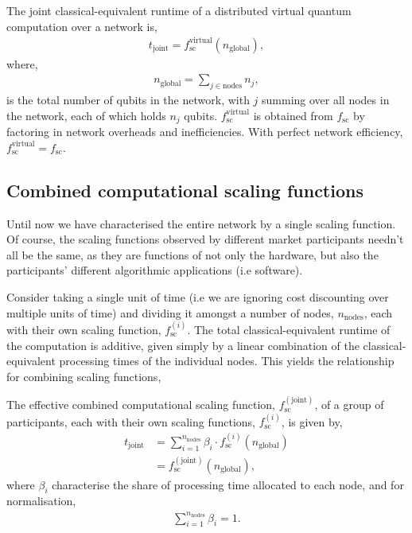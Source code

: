 \begin{definition}
The joint classical-equivalent runtime of a distributed virtual quantum computation over a network is,
\begin{align}
t_\mathrm{joint} = f_\mathrm{sc}^\mathrm{virtual}(n_\mathrm{global}),
\end{align}
where,
\begin{align}
n_\mathrm{global} = \sum_{j\in\mathrm{nodes}} n_j,
\end{align}
is the total number of qubits in the network, with $j$ summing over all nodes in the network, each of which holds $n_j$ qubits. $f_\mathrm{sc}^\mathrm{virtual}$ is obtained from $f_\mathrm{sc}$ by factoring in network overheads and inefficiencies. With perfect network efficiency, \mbox{$f_\mathrm{sc}^\mathrm{virtual}=f_\mathrm{sc}$}.
\end{definition}

%
%

\subsection{Combined computational scaling functions}\label{sec:comb_comp_sc_func}

Until now we have characterised the entire network by a single scaling function. Of course, the scaling functions observed by different market participants needn't all be the same, as they are functions of not only the hardware, but also the participants' different algorithmic applications (i.e software).

Consider taking a single unit of time (i.e we are ignoring cost discounting over multiple units of time) and dividing it amongst a number of nodes, $n_\mathrm{nodes}$, each with their own scaling function, $f_\mathrm{sc}^{(i)}$. The total classical-equivalent runtime of the computation is additive, given simply by a linear combination of the classical-equivalent processing times of the individual nodes. This yields the relationship for combining scaling functions,
\begin{definition}\label{def:comb_sc_func}
The effective combined computational scaling function, $f_\mathrm{sc}^\mathrm{(joint)}$, of a group of participants, each with their own scaling functions, $f_\mathrm{sc}^{(i)}$, is given by,
\begin{align}
	t_\mathrm{joint} &= \sum_{i=1}^{n_{\mathrm{nodes}}} \beta_i \cdot f_\mathrm{sc}^{(i)}(n_\mathrm{global}) \nonumber \\
	&= f_\mathrm{sc}^\mathrm{(joint)}(n_\mathrm{global}),
\end{align}
where $\beta_i$ characterise the share of processing time allocated to each node, and for normalisation,
\begin{align}
\sum_{i=1}^{n_\mathrm{nodes}} \beta_i = 1.
\end{align}
\end{definition}

